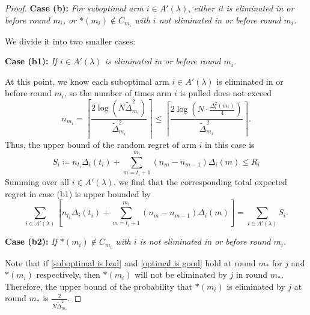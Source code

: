 \documentclass[11pt]{article}
\begin{document}
\begin{proof}
\textbf{Case (b):} \textit{ For suboptimal arm \( i \in A'(\lambda)\), either it is eliminated in or before round \( m_i \), or \( *(m_i) \notin C_{m_i} \) with $i$ not eliminated in or before round \( m_i \). }

We divide it into two smaller cases:

\textbf{Case (b1):}\textit{ If \( i \in A'(\lambda)\) is eliminated in or before round \( m_i \).  }

At this point, we know each suboptimal arm \( i \in A'(\lambda) \) is eliminated in or before round \( m_i \), so the number of times arm \( i \) is pulled does not exceed 
\[ n_{m_i} = \left\lceil \frac{2\log(N \tilde{\Delta}_{m_i}^2)}{\tilde{\Delta}_{m_i}^2} \right\rceil \leq \left\lceil \frac{2\log\left(N \cdot \frac{\Delta_i^2(m_i)}{4}\right)}{\tilde{\Delta}_{m_i}^2} \right\rceil .\]
Thus, the upper bound of the random regret of arm $i$ in this case is
\[S_i\coloneqq n_{t_i}\Delta_i(t_i) + \sum_{m = t_i + 1}^{m_i} (n_m - n_{m-1})\Delta_i(m) \leq R_i \] Summing over all $i\in A'(\lambda)$, we find that the corresponding total expected regret in case (b1) is upper bounded by 
\[\sum_{i \in A'(\lambda)} \left[ n_{t_i}\Delta_i(t_i) + \sum_{m = t_i + 1}^{m_i} (n_m - n_{m-1})\Delta_i(m) \right] =\sum_{i \in A'(\lambda)} S_i.\]

\textbf{Case (b2):}\textit{ If \( *(m_i) \notin C_{m_i} \) with $i$ is not eliminated in or before round \( m_i \). }  

Note that if \eqref{suboptimal is bad} and \eqref{optimal is good} hold at round \( m_* \) for $j$ and $*(m_i)$ respectively, then \( *(m_i) \) will not be eliminated by \( j \) in round $m_*$. Therefore, the upper bound of the probability that \( *(m_i) \) is eliminated by \( j \) at round \( m_* \) is \( \frac{2}{N \tilde{\Delta}_{m_*}^2} \). 


\end{proof}
\end{document}
